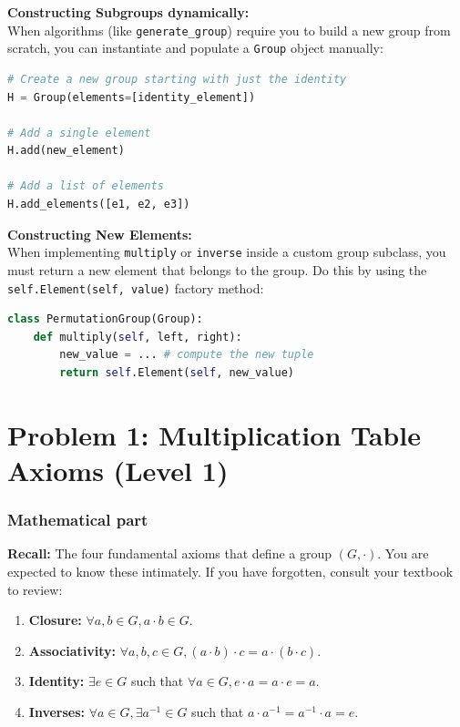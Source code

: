 \documentclass[11pt]{article}
\begin{document}
\textbf{Constructing Subgroups dynamically:}\\
When algorithms (like \lstinline|generate_group|) require you to build a new group from scratch, you can instantiate and populate a \lstinline|Group| object manually:
\begin{lstlisting}[language=Python]
# Create a new group starting with just the identity
H = Group(elements=[identity_element])

# Add a single element
H.add(new_element)

# Add a list of elements
H.add_elements([e1, e2, e3])
\end{lstlisting}

\textbf{Constructing New Elements:}\\
When implementing \lstinline|multiply| or \lstinline|inverse| inside a custom group subclass, you must return a new element that belongs to the group. Do this by using the \lstinline|self.Element(self, value)| factory method:
\begin{lstlisting}[language=Python]
class PermutationGroup(Group):
    def multiply(self, left, right):
        new_value = ... # compute the new tuple
        return self.Element(self, new_value)
\end{lstlisting}

\section*{Problem 1: Multiplication Table Axioms (Level 1)}

\subsubsection*{Mathematical part}
\textbf{Recall:} The four fundamental axioms that define a group $(G, \cdot)$. You are expected to know these intimately. If you have forgotten, consult your textbook to review:
\begin{enumerate}
    \item \textbf{Closure:} $\forall a, b \in G, a \cdot b \in G$.
    \item \textbf{Associativity:} $\forall a, b, c \in G, (a \cdot b) \cdot c = a \cdot (b \cdot c)$.
    \item \textbf{Identity:} $\exists e \in G$ such that $\forall a \in G, e \cdot a = a \cdot e = a$.
    \item \textbf{Inverses:} $\forall a \in G, \exists a^{-1} \in G$ such that $a \cdot a^{-1} = a^{-1} \cdot a = e$.
\end{enumerate}
\end{document}

